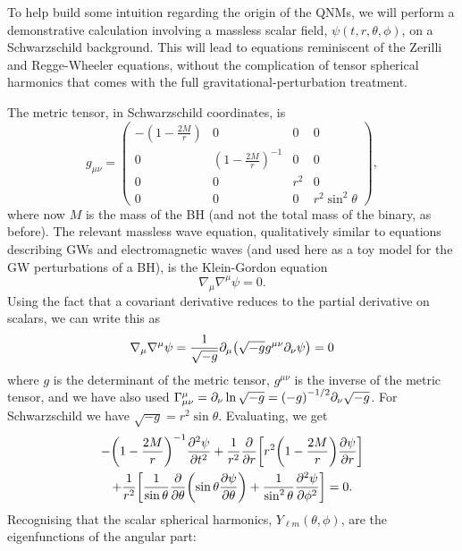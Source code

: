 To help build some intuition regarding the origin of the QNMs, we will perform a demonstrative calculation involving a massless scalar field, $\psi(t,r,\theta,\phi)$, on a Schwarzschild background.
This will lead to equations reminiscent of the Zerilli and Regge-Wheeler equations, without the complication of tensor spherical harmonics that comes with the full gravitational-perturbation treatment.

The metric tensor, in Schwarzschild coordinates, is
\begin{equation}
g_{\mu\nu} = \begin{pmatrix}
- \left(1 - \frac{2M}{r}\right) & 0 & 0 & 0 \\
0 & \left(1 - \frac{2M}{r}\right)^{-1} & 0 & 0 \\
0 & 0 & r^2 & 0 \\
0 & 0 & 0 & r^2 \sin^2\theta
\end{pmatrix},
\end{equation}
where now $M$ is the mass of the BH (and not the total mass of the binary, as before). 
The relevant massless wave equation, qualitatively similar to equations describing GWs and electromagnetic waves (and used here as a toy model for the GW perturbations of a BH), is the Klein-Gordon equation 
\begin{equation}
    \nabla_\mu \nabla^\mu \psi = 0.
\end{equation}
Using the fact that a covariant derivative reduces to the partial derivative on scalars, we can write this as
\begin{equation}
    \nabla_\mu \nabla^\mu \psi = \frac{1}{\sqrt{-g}} \partial_\mu \qty(\sqrt{-g} g^{\mu\nu} \partial_\nu \psi) = 0
\end{equation}
where $g$ is the determinant of the metric tensor, $g^{\mu\nu}$ is the inverse of the metric tensor, and we have also used $\Gamma^\mu_{\mu\nu} = \partial_\nu \ln{\sqrt{-g}} = \qty(-g)^{-1/2} \partial_\nu \sqrt{-g}$.
For Schwarzschild we have $\sqrt{-g} = r^2 \sin{\theta}$.
Evaluating, we get
\begin{multline}
    - \qty(1 - \frac{2M}{r})^{-1} \pdv[2]{\psi}{t} + \frac{1}{r^2} \pdv{r} \qty[r^2 \qty(1 - \frac{2M}{r}) \pdv{\psi}{r} ]\\
    + \frac{1}{r^2} \qty[ \frac{1}{\sin{\theta}} \pdv{\theta} \qty(\sin{\theta} \pdv{\psi}{\theta} ) + \frac{1}{\sin^2{\theta}} \pdv[2]{\psi}{\phi} ] = 0.
\end{multline}
Recognising that the scalar spherical harmonics, $Y_{\ell m}(\theta,\phi)$, are the eigenfunctions of the angular part:
